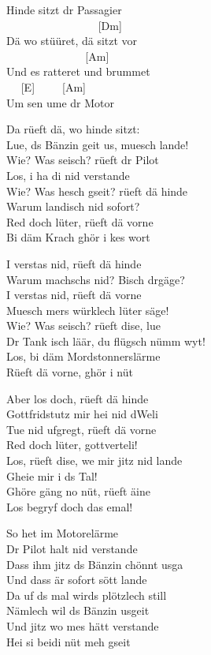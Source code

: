 \documentclass[
  letterpaper,
]{scrbook}
\begin{document}
Hinde sitzt dr Passagier\\
\hspace*{0.333em} ~ ~ ~ ~ ~ ~ ~ ~ ~ ~ {[}Dm{]}\\
Dä wo stüüret, dä sitzt vor\\
\hspace*{0.333em} ~ ~ ~ ~ ~ ~ ~ ~ ~{[}Am{]}\\
Und es ratteret und brummet\\
\hspace*{0.333em} ~ ~{[}E{]} ~ ~ ~{[}Am{]}\\
Um sen ume dr Motor

Da rüeft dä, wo hinde sitzt:\\
Lue, ds Bänzin geit us, muesch lande!\\
Wie? Was seisch? rüeft dr Pilot\\
Los, i ha di nid verstande\\
Wie? Was hesch gseit? rüeft dä hinde\\
Warum landisch nid sofort?\\
Red doch lüter, rüeft dä vorne\\
Bi däm Krach ghör i kes wort

I versta\textquotesingle s nid, rüeft dä hinde\\
Warum machsch\textquotesingle s nid? Bisch drgäge?\\
I versta\textquotesingle s nid, rüeft dä vorne\\
Muesch mer\textquotesingle s würklech lüter säge!\\
Wie? Was seisch? rüeft dise, lue\\
Dr Tank isch läär, du flügsch nümm wyt!\\
Los, bi däm Mordstonnerslärme\\
Rüeft dä vorne, ghör i nüt

Aber los doch, rüeft dä hinde\\
Gottfridstutz mir hei nid d\textquotesingle Weli\\
Tue nid ufgregt, rüeft dä vorne\\
Red doch lüter, gottverteli!\\
Los, rüeft dise, we mir jitz nid lande\\
Gheie mir i ds Tal!\\
Ghöre gäng no nüt, rüeft äine\\
Los begryf doch das emal!

So het im Motorelärme\\
Dr Pilot halt nid verstande\\
Dass ihm jitz ds Bänzin chönnt usga\\
Und dass är sofort sött lande\\
Da uf ds mal wird\textquotesingle s plötzlech still\\
Nämlech wil ds Bänzin usgeit\\
Und jitz wo me\textquotesingle s hätt verstande\\
Hei si beidi nüt meh gseit
\end{document}
